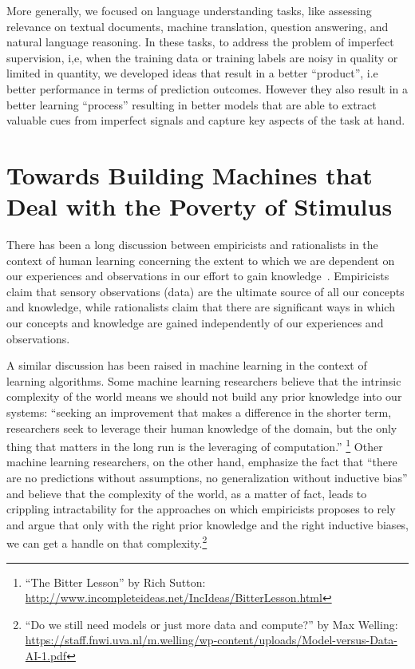More generally, we focused on language understanding tasks, like assessing relevance on textual documents, machine translation, question answering, and natural language reasoning. In these tasks, to address the problem of imperfect supervision, i,e, when the training data or training labels are noisy in quality or limited in quantity, we developed ideas that result in a better ``product'', i.e better performance in terms of prediction outcomes.  However they also result in a better learning ``process'' resulting in better models that are able to extract valuable cues from imperfect signals and capture key aspects of the task at hand.


\section{Towards Building Machines that Deal with the Poverty of Stimulus}

There has been a long discussion between empiricists and rationalists in the context of human learning concerning the extent to which we are dependent on our experiences and observations in our effort to gain knowledge~\citep{markie2004rationalism}.  
%
Empiricists claim that sensory observations (data) are the ultimate source of all our concepts and knowledge, while rationalists claim that there are significant ways in which our concepts and knowledge are gained independently of our experiences and observations. 

A similar discussion has been raised in machine learning in the context of learning algorithms.
%
Some machine learning researchers believe that the intrinsic complexity of the world means we should not build any prior knowledge into our systems: ``seeking an improvement that makes a difference in the shorter term, researchers seek to leverage their human knowledge of the domain, but the only thing that matters in the long run is the leveraging of computation.''%
\footnote{``The Bitter Lesson'' by Rich Sutton: \url{http://www.incompleteideas.net/IncIdeas/BitterLesson.html}}
%
Other machine learning researchers, on the other hand, emphasize the fact that ``there are no predictions without assumptions, no generalization without inductive bias'' and believe that the complexity of the world, as a matter of fact, leads to crippling intractability for the approaches on which empiricists proposes to rely and argue that only with the right prior knowledge and the right inductive biases, we can get a handle on that complexity.\footnote{``Do we still need models or just more data and compute?'' by Max Welling: \url{https://staff.fnwi.uva.nl/m.welling/wp-content/uploads/Model-versus-Data-AI-1.pdf}}


